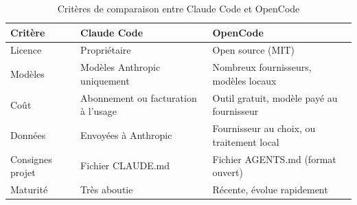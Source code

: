 \documentclass[11pt,a4paper]{article}
\begin{document}
\vspace{6pt}

\begin{table}[H]
\centering
\small
\captionsetup{position=top}
\caption{Critères de comparaison entre Claude Code et OpenCode}
\label{tab:comparatif}
\begin{tabularx}{0.9\textwidth}{l >{\raggedright\arraybackslash}X >{\raggedright\arraybackslash}X}
\toprule
Critère & Claude Code & OpenCode \\
\midrule
Licence & Propriétaire & Open source (MIT) \\
Modèles & Modèles Anthropic uniquement & Nombreux fournisseurs, modèles locaux \\
Coût & Abonnement ou facturation à l'usage & Outil gratuit, modèle payé au fournisseur \\
Données & Envoyées à Anthropic & Fournisseur au choix, ou traitement local \\
Consignes projet & Fichier CLAUDE.md & Fichier AGENTS.md (format ouvert) \\
Maturité & Très aboutie & Récente, évolue rapidement \\
\bottomrule
\end{tabularx}
\end{table}
\end{document}

